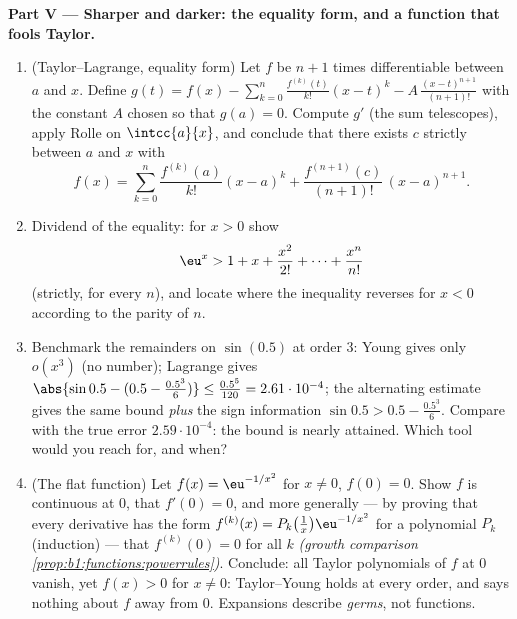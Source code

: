 \begin{problem}
\medskip
\noindent\textbf{Part V --- Sharper and darker: the equality
form, and a function that fools Taylor.}
\begin{enumerate}[resume]
  \item (Taylor--Lagrange, equality form) Let $f$ be $n + 1$
        times differentiable between $a$ and $x$. Define $g(t) =
        f(x) - \sum_{k=0}^{n} \frac{f^{(k)}(t)}{k!}(x - t)^k -
        A\,\frac{(x-t)^{n+1}}{(n+1)!}$ with the constant $A$
        chosen so that $g(a) = 0$. Compute $g'$ (the sum
        telescopes), apply Rolle on $\intcc{a}{x}$, and conclude
        that there exists $c$ strictly between $a$ and $x$ with
        \[
        f(x) = \sum_{k=0}^{n} \frac{f^{(k)}(a)}{k!}(x-a)^k
        + \frac{f^{(n+1)}(c)}{(n+1)!}\,(x-a)^{n+1} .
        \]
  \item Dividend of the equality: for $x > 0$ show
        \[
        \eu^x > 1 + x + \frac{x^2}{2!} + \dots +
        \frac{x^n}{n!}
        \]
        (strictly, for every $n$), and locate where the
        inequality reverses for $x < 0$ according to the parity
        of $n$.
  \item Benchmark the remainders on $\sin(0.5)$ at order $3$:
        Young gives only $o(x^3)$ (no number); Lagrange gives
        $\abs{\sin 0.5 - (0.5 - \frac{0.5^3}{6})} \leq
        \frac{0.5^5}{120} = 2.61\cdot10^{-4}$; the alternating
        estimate gives the same bound \emph{plus} the sign
        information $\sin 0.5 > 0.5 - \frac{0.5^3}{6}$. Compare
        with the true error $2.59\cdot10^{-4}$: the bound is
        nearly attained. Which tool would you reach for, and
        when?
  \item (The flat function) Let $f(x) = \eu^{-1/x^2}$ for $x
        \neq 0$, $f(0) = 0$. Show $f$ is continuous at $0$, that
        $f'(0) = 0$, and more generally --- by proving that
        every derivative has the form $f^{(k)}(x) =
        P_k\bigl(\frac1x\bigr)\eu^{-1/x^2}$ for a polynomial
        $P_k$ (induction) --- that $f^{(k)}(0) = 0$ for all $k$
        \emph{(growth comparison
        \cref{prop:b1:functions:powerrules})}. Conclude: all
        Taylor polynomials of $f$ at $0$ vanish, yet $f(x) > 0$
        for $x \neq 0$: Taylor--Young holds at every order, and
        says nothing about $f$ away from $0$. Expansions
        describe \emph{germs}, not functions.
\end{enumerate}


\end{problem}
